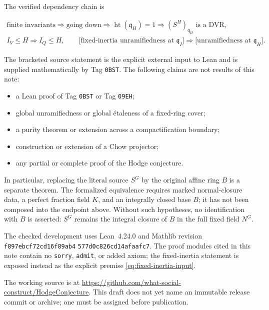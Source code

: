 \documentclass[11pt]{article}
\theoremstyle{remark}
\DeclareMathOperator{\htop}{ht}
\newcommand{\q}{\mathfrak q}
\newcommand{\leanpath}[1]{\texttt{\nolinkurl{#1}}}
\begin{document}
The verified dependency chain is

\[
\begin{gathered}
  \text{finite invariants}
  \Longrightarrow
  \text{going down}
  \Longrightarrow
  \htop(\q_H)=1
  \Longrightarrow
  (S^H)_{\q_H}\text{ is a DVR},\\[4pt]
  I_V\leq H
  \Longrightarrow
  I_Q\leq H,
  \qquad
  \bigl[\text{fixed-inertia unramifiedness at }\q_I\bigr]
  \Longrightarrow
  \bigl[\text{unramifiedness at }\q_H\bigr].
\end{gathered}
\]

The bracketed source statement is the explicit external input to Lean and
is supplied mathematically by Tag \texttt{0BST}.  The following claims are
not results of this note:

\begin{itemize}[leftmargin=2.2em]
  \item a Lean proof of Tag \texttt{0BST} or Tag \texttt{09EH};
  \item global unramifiedness or global \'etaleness of a fixed-ring
        cover;
  \item a purity theorem or extension across a compactification boundary;
  \item construction or extension of a Chow projector;
  \item any partial or complete proof of the Hodge conjecture.
\end{itemize}

In particular, replacing the literal source \(S^G\) by the original affine
ring \(B\) is a separate theorem.  The formalized equivalence requires marked
normal-closure data, a perfect fraction field \(K\), and an integrally closed
base \(B\); it has not been composed into the endpoint above.  Without such
hypotheses, no identification with \(B\) is asserted: \(S^G\) remains the
integral closure of \(B\) in the full fixed field \(N^G\).

The checked development uses Lean~4.24.0 and Mathlib revision
\texttt{f897ebcf72cd16f89ab4}\allowbreak
\texttt{577d0c826cd14afaafc7}.  The proof modules
cited in this note contain no \leanpath{sorry}, \leanpath{admit}, or added
axiom; the fixed-inertia statement is exposed instead as the explicit
premise \eqref{eq:fixed-inertia-input}.

The working source is at
\url{https://github.com/what-social-construct/HodgeConjecture}.  This draft
does not yet name an immutable release commit or archive; one must be
assigned before publication.
\end{document}

